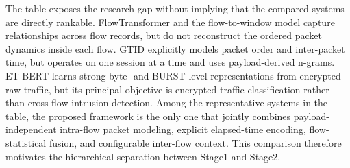 \documentclass[11pt,fleqn]{report}
\begin{document}
The table exposes the research gap without implying that the compared systems are directly rankable. FlowTransformer and the flow-to-window model capture relationships across flow records, but do not reconstruct the ordered packet dynamics inside each flow. GTID explicitly models packet order and inter-packet time, but operates on one session at a time and uses payload-derived n-grams. ET-BERT learns strong byte- and BURST-level representations from encrypted raw traffic, but its principal objective is encrypted-traffic classification rather than cross-flow intrusion detection. Among the representative systems in the table, the proposed framework is the only one that jointly combines payload-independent intra-flow packet modeling, explicit elapsed-time encoding, flow-statistical fusion, and configurable inter-flow context. This comparison therefore motivates the hierarchical separation between Stage1 and Stage2.


\end{document}
